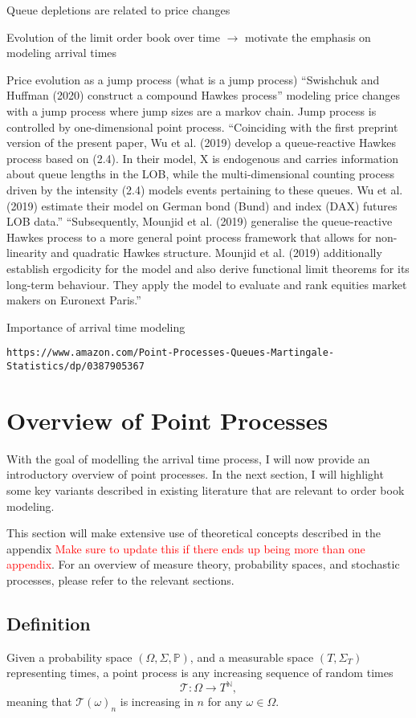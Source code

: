 \documentclass[honours,12pt]{unswthesis}
\numberwithin{equation}{section}
\begin{document}
Queue depletions are related to price changes \cite{BouchaudEtAl}

Evolution of the limit order book over time $\to$ motivate the emphasis on modeling arrival times

Price evolution as a jump process (what is a jump process)
``Swishchuk and Huffman (2020) construct a compound Hawkes process'' modeling price changes with a jump process where jump sizes are a markov chain. Jump process is controlled by one-dimensional point process.
``Coinciding with the first preprint version of the present paper, Wu et al. (2019) develop a queue-reactive Hawkes process based on (2.4). In their model, X is endogenous and carries information about queue lengths in the LOB, while the multi-dimensional counting process driven by the intensity (2.4) models events pertaining to these queues. Wu et al. (2019) estimate their model on German bond (Bund) and index (DAX) futures LOB data.''
``Subsequently, Mounjid et al. (2019) generalise the queue-reactive Hawkes process to a more general point process framework that allows for non-linearity and quadratic Hawkes structure.  Mounjid et al. (2019) additionally establish ergodicity for the model and also derive functional limit theorems for its long-term behaviour. They apply the model to evaluate and rank equities market makers on Euronext Paris.''

Importance of arrival time modeling

\texttt{https://www.amazon.com/Point-Processes-Queues-Martingale-Statistics/dp/0387905367}

\section{Overview of Point Processes}
With the goal of modelling the arrival time process, I will now provide an introductory overview of point processes. In the next section, I will highlight some key variants described in existing literature that are relevant to order book modeling.

This section will make extensive use of theoretical concepts described in the appendix \textcolor{red}{Make sure to update this if there ends up being more than one appendix}. For an overview of measure theory, probability spaces, and stochastic processes, please refer to the relevant sections.

\subsection{Definition}
Given a probability space $(\Omega,\Sigma,\mathbb P)$, and a measurable space $(T,\Sigma_T)$ representing times, a point process is any increasing sequence of random times $$\mathcal T : \Omega\to T^\mathbb{N},$$
meaning that $\mathcal{T}(\omega)_n$ is increasing in $n$ for any $\omega\in\Omega$.
\end{document}
